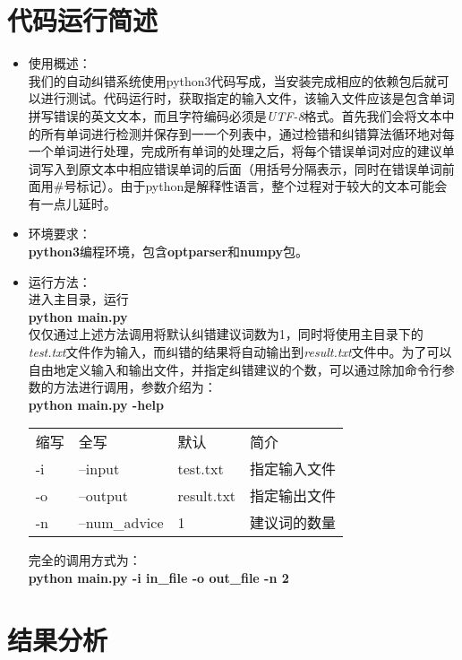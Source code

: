 \documentclass[UTF8,a4paper]{ctexart}
\begin{document}
\section{代码运行简述}

\begin{itemize}
    \item 使用概述： \\
    我们的自动纠错系统使用python3代码写成，当安装完成相应的依赖包后就可以进行测试。代码运行时，获取指定的输入文件，该输入文件应该是包含单词拼写错误的英文文本，而且字符编码必须是\textit{UTF-8}格式。首先我们会将文本中的所有单词进行检测并保存到一一个列表中，通过检错和纠错算法循环地对每一个单词进行处理，完成所有单词的处理之后，将每个错误单词对应的建议单词写入到原文本中相应错误单词的后面（用括号分隔表示，同时在错误单词前面用\#号标记）。由于python是解释性语言，整个过程对于较大的文本可能会有一点儿延时。
  \item 环境要求： \\
  \textbf{python3}编程环境，包含\textbf{optparser}和\textbf{numpy}包。
  \item 运行方法： \\
  进入主目录，运行 \\
  \quad \textbf{python main.py} \\
  仅仅通过上述方法调用将默认纠错建议词数为1，同时将使用主目录下的\textit{test.txt}文件作为输入，而纠错的结果将自动输出到\textit{result.txt}文件中。为了可以自由地定义输入和输出文件，并指定纠错建议的个数，可以通过除加命令行参数的方法进行调用，参数介绍为： \\
  \quad \textbf{python main.py -help}

  \begin{tabular}{|l|l|l|l|}
    \hline
    缩写 & 全写 & 默认 & 简介 \\
    -i & --input & test.txt & 指定输入文件 \\
    -o & --output & result.txt & 指定输出文件 \\
    -n & --num\_advice & 1 & 建议词的数量  \\
    \hline
  \end{tabular}

  完全的调用方式为： \\
  \quad \textbf{python main.py -i in\_file -o out\_file -n 2}
\end{itemize}

\section{结果分析}



\clearpage


\end{document}
